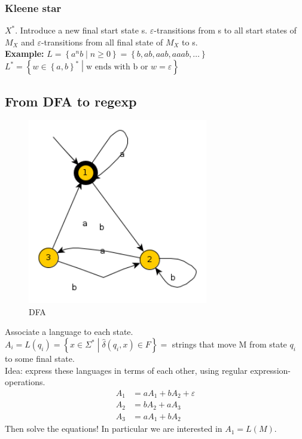\documentclass[a4paper]{article}
\begin{document}
\subsubsection{Kleene star}
$X^*$. Introduce a new final start state s. $\varepsilon$-transitions
from s to all start states of $M_X$ and $\varepsilon$-transitions from all
final state of $M_X$ to s.\\
\textbf{Example:} $L=\left\{a^nb \middle | n\geq 0 \right\}= \left\{ b,ab,aab,aaab,\ldots \right\}$\\
$L^*=\left\{ w\in \left\{ a,b \right\}^* \middle | \mbox{w ends with b or }w=\varepsilon \right\}$
\subsection{From DFA to regexp}
\begin{figure}[H]
    \centering
    \includegraphics[width=0.7\textwidth]{dfa2regex.png}
    \caption{DFA}
\end{figure}
Associate a language to each state.\\
$A_i=L(q_i)=\left\{ x\in \Sigma^* \middle | \hat{\delta}(q_i,x)\in F \right\}=$
strings that move M from state $q_i$ to some final state.\\
Idea: express these languages in terms of each other, using regular expression-operations.
\begin{align}
    A_1&=aA_1+bA_2+\varepsilon\\
    A_2&=bA_2+aA_3\\
    A_3&=aA_1+bA_2
\end{align}
Then solve the equations! In particular we are interested in $A_1=L(M)$.
\end{document}
